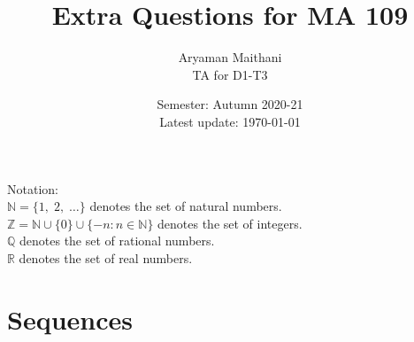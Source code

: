 \documentclass{article}
\title{Extra Questions for MA 109}
\author{Aryaman Maithani\\
\small TA for D1-T3}
\date{Semester: Autumn 2020-21\\ Latest update: \today}
\begin{document}
\maketitle
\hrulefill

Notation:\\
$\mathbb{N} = \{1,\; 2,\; \ldots\}$ denotes the set of natural numbers.\\
$\mathbb{Z} = \mathbb{N} \cup \{0\} \cup \{-n : n\in\mathbb{N}\}$ denotes the set of integers.\\
$\mathbb{Q}$ denotes the set of rational numbers.\\
$\mathbb{R}$ denotes the set of real numbers.\\
\section{Sequences}
\end{document}
